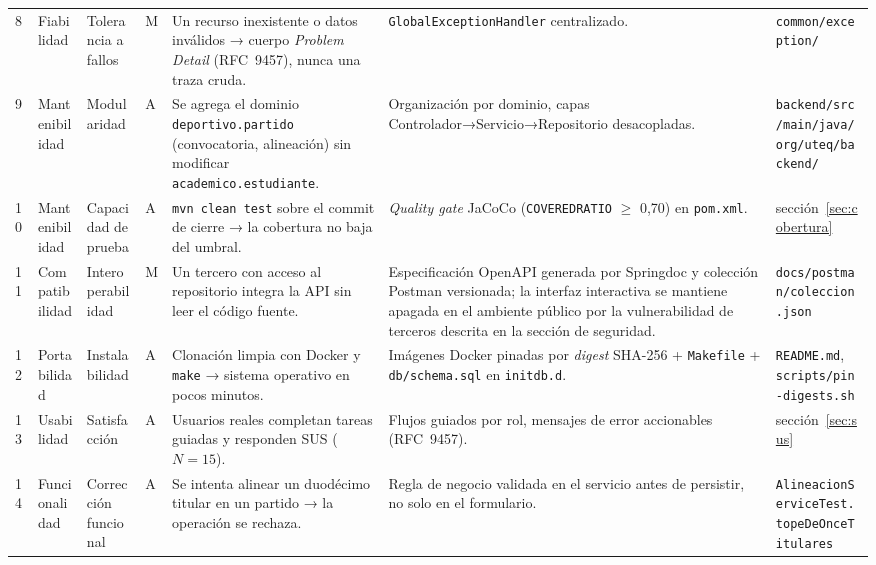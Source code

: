 \documentclass[11pt,a4paper]{article}
\newcommand{\ruta}[1]{\texttt{\footnotesize #1}}
\begin{document}
\begin{table}[htbp]
\begin{tabular}{@{}p{0.35cm}p{1.9cm}p{2.3cm}p{0.35cm}p{3.6cm}p{3.4cm}p{2.35cm}@{}}
8 & Fiabilidad & Tolerancia a fallos & M & Un recurso inexistente o datos inválidos → cuerpo \emph{Problem Detail} (RFC~9457), nunca una traza cruda. & \texttt{Global\allowbreak Exception\allowbreak Handler} centralizado. & \texttt{common/\allowbreak exception/} \\
9 & Mantenibilidad & Modularidad & A & Se agrega el dominio \texttt{deportivo.\allowbreak partido} (convocatoria, alineación) sin modificar \texttt{academico.\allowbreak estudiante}. & Organización por dominio, capas Controlador→\allowbreak Servicio→\allowbreak Repositorio desacopladas. & \ruta{backend/\allowbreak src/\allowbreak main/\allowbreak java/\allowbreak org/\allowbreak uteq/\allowbreak backend/} \\
10 & Mantenibilidad & Capacidad de prueba & A & \texttt{mvn clean test} sobre el commit de cierre → la cobertura no baja del umbral. & \emph{Quality gate} JaCoCo (\texttt{COVEREDRATIO} $\geq$ 0,70) en \texttt{pom.xml}. & sección~\ref{sec:cobertura} \\
11 & Compatibilidad & Interopera\-bilidad & M & Un tercero con acceso al repositorio integra la API sin leer el código fuente. & Especificación OpenAPI generada por Springdoc y colección Postman versionada; la interfaz interactiva se mantiene apagada en el ambiente público por la vulnerabilidad de terceros descrita en la sección de seguridad. & \ruta{docs/\allowbreak postman/\allowbreak coleccion.json} \\
12 & Portabilidad & Instalabilidad & A & Clonación limpia con Docker y \texttt{make} → sistema operativo en pocos minutos. & Imágenes Docker pinadas por \emph{digest} SHA-256 + \texttt{Makefile} + \ruta{db/\allowbreak schema.sql} en \texttt{initdb.d}. & \texttt{README.md}, \texttt{scripts/\allowbreak pin-digests.sh} \\
13 & Usabilidad & Satisfacción & A & Usuarios reales completan tareas guiadas y responden SUS ($N=15$). & Flujos guiados por rol, mensajes de error accionables (RFC~9457). & sección~\ref{sec:sus} \\
14 & Funcionalidad & Corrección funcional & A & Se intenta alinear un duodécimo titular en un partido → la operación se rechaza. & Regla de negocio validada en el servicio antes de persistir, no solo en el formulario. & \texttt{Alineacion\allowbreak ServiceTest.\allowbreak tope\allowbreak De\allowbreak Once\allowbreak Titulares} \\
\bottomrule
\end{tabular}
\end{table}
\end{document}
